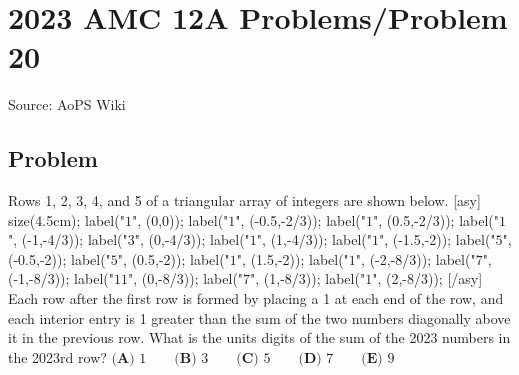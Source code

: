 \documentclass[12pt]{article}
\begin{document}
\section*{{2023 AMC 12A Problems/Problem 20}}
Source: AoPS Wiki

\subsection*{Problem}
Rows 1, 2, 3, 4, and 5 of a triangular array of integers are shown below. [asy] size(4.5cm); label("$1$", (0,0)); label("$1$", (-0.5,-2/3)); label("$1$", (0.5,-2/3)); label("$1$", (-1,-4/3)); label("$3$", (0,-4/3)); label("$1$", (1,-4/3)); label("$1$", (-1.5,-2)); label("$5$", (-0.5,-2)); label("$5$", (0.5,-2)); label("$1$", (1.5,-2)); label("$1$", (-2,-8/3)); label("$7$", (-1,-8/3)); label("$11$", (0,-8/3)); label("$7$", (1,-8/3)); label("$1$", (2,-8/3)); [/asy] Each row after the first row is formed by placing a 1 at each end of the row, and each interior entry is 1 greater than the sum of the two numbers diagonally above it in the previous row. What is the units digits of the sum of the 2023 numbers in the 2023rd row? $\textbf{(A) } 1 \qquad \textbf{(B) } 3 \qquad \textbf{(C) } 5 \qquad \textbf{(D) } 7 \qquad \textbf{(E) } 9$
\end{document}
